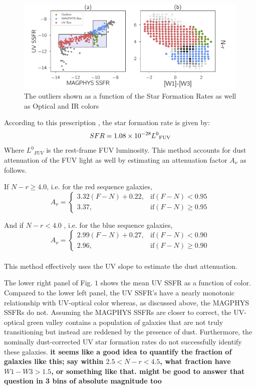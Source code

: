 \documentclass[iop]{emulateapj}
\begin{document}
\begin{figure}
	\centering
		\includegraphics[width = 16 cm, height = 6.4 cm]{Outliers.pdf}
	\caption{The outliers shown as a function of the Star Formation Rates as well as Optical and IR colors} 
\end{figure}

According to this prescription \citep{salim_uv_2007}, the star formation 
rate is given by:
$$ SFR = 1.08 \times 10^{-28}{L^{0}}_{\rm FUV} $$
Where ${L^{0}}_{FUV}$ is the rest-frame FUV luminosity. This 
method accounts for dust attenuation of the FUV light as well by 
estimating an attenuation factor $A_{\nu}$ as 
follows.

If $N-r \geq 4.0$, i.e. for the red sequence galaxies,\\
$$ A_{\nu} = 
\begin{cases} 3.32 (F-N) + 0.22, & \text{if} (F-N) < 0.95\\
3.37, & \text{if} (F-N) \geq 0.95 
\end{cases}$$

And if $N-r < 4.0$ , i.e. for the blue sequence galaxies,\\
$$A_{\nu} = 
\begin{cases} 2.99(F-N) + 0.27, & \text{if}(F-N) < 0.90\\
2.96, & \text{if} (F-N) \geq 0.90 
\end{cases}$$\\

This method effectively uses the UV slope to estimate the 
dust attenuation.

The lower right panel of Fig. $1$ shows the mean UV SSFR as 
a function of color. Compared to the lower left panel, the UV 
SSFR's have a nearly monotonic relationship with UV-optical color 
whereas, as discussed above, the  MAGPHYS SSFRs do not. 
Assuming the MAGPHYS SSFRs are closer to correct, the UV-optical green 
valley contains a population of galaxies that are not truly transitioning 
but instead are reddened by the presence of dust. Furthermore, the nominally
dust-corrected UV star formation rates do not successfully identify
these galaxies. \textbf{it seems like a good idea to quantify the 
fraction of galaxies like this; say within $2.5 < N-r < 4.5$, what fraction
have $W1-W3 > 1.5$, or something like that. might be good to answer 
that question in 3 bins of absolute magnitude too}
\end{document}
